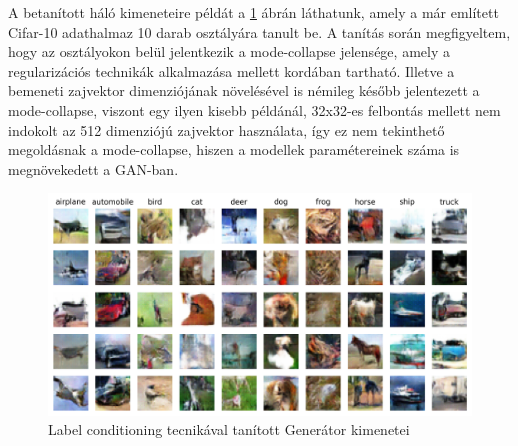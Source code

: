 A betanított háló kimeneteire példát a \ref{fig:labelconditioning} ábrán láthatunk, amely a már említett Cifar-10 adathalmaz 10 darab osztályára tanult be. A tanítás során megfigyeltem, hogy az osztályokon belül jelentkezik a mode-collapse jelensége, amely a regularizációs technikák alkalmazása mellett kordában tartható. Illetve a bemeneti zajvektor dimenziójának növelésével is némileg később jelentezett a mode-collapse, viszont egy ilyen kisebb példánál, 32x32-es felbontás mellett nem indokolt az 512 dimenziójú zajvektor használata, így ez nem tekinthető megoldásnak a mode-collapse, hiszen a modellek paramétereinek száma is megnövekedett a GAN-ban.

\begin{figure}[h]
\centering
\includegraphics[width=13cm]{images/label_conditioning.png}
\caption{Label conditioning tecnikával tanított Generátor kimenetei}
\label{fig:labelconditioning}
\end{figure}